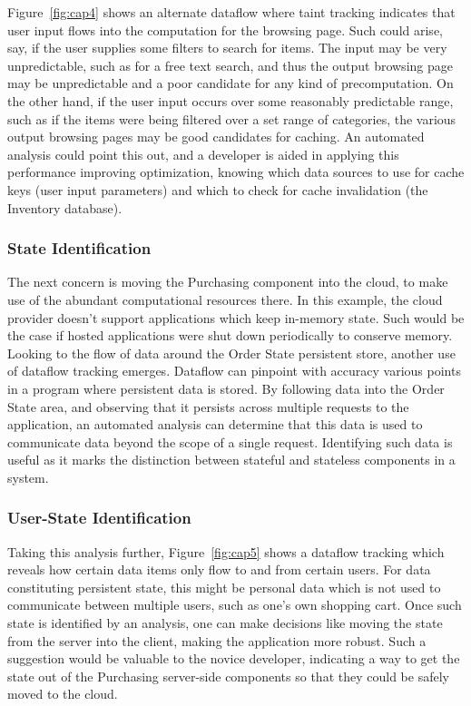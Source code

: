 \documentclass[msc,oneside]{ubcthesis}
\begin{document}
Figure~\ref{fig:cap4} shows an alternate dataflow where taint tracking indicates that user input flows into the computation for the browsing page. Such could arise, say, if the user supplies some filters to search for items. The input may be very unpredictable, such as for a free text search, and thus the output browsing page may be unpredictable and a poor candidate for any kind of precomputation. On the other hand, if the user input occurs over some reasonably predictable range, such as if the items were being filtered over a set range of categories, the various output browsing pages may be good candidates for caching. An automated analysis could point this out, and a developer is aided in applying this performance improving optimization, knowing which data sources to use for cache keys (user input parameters) and which to check for cache invalidation (the Inventory database).

\subsubsection{State Identification}
The next concern is moving the Purchasing component into the cloud, to make use of the abundant computational resources there. In this example, the cloud provider doesn't support applications which keep in-memory state. Such would be the case if hosted applications were shut down periodically to conserve memory. Looking to the flow of data around the Order State persistent store, another use of dataflow tracking emerges. Dataflow can pinpoint with accuracy various points in a program where persistent data is stored. By following data into the Order State area, and observing that it persists across multiple requests to the application, an automated analysis can determine that this data is used to communicate data beyond the scope of a single request. Identifying such data is useful as it marks the distinction between stateful and stateless components in a system.

\subsubsection{User-State Identification}
Taking this analysis further, Figure~\ref{fig:cap5} shows a dataflow tracking which reveals how certain data items only flow to and from certain users. For data constituting persistent state, this might be personal data which is not used to communicate between multiple users, such as one's own shopping cart. Once such state is identified by an analysis, one can make decisions like moving the state from the server into the client, making the application more robust. Such a suggestion would be valuable to the novice developer, indicating a way to get the state out of the Purchasing server-side components so that they could be safely moved to the cloud.
\end{document}
